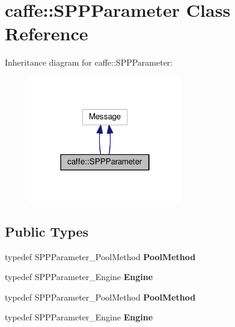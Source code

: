 \hypertarget{classcaffe_1_1_s_p_p_parameter}{}\section{caffe\+:\+:S\+P\+P\+Parameter Class Reference}
\label{classcaffe_1_1_s_p_p_parameter}


Inheritance diagram for caffe\+:\+:S\+P\+P\+Parameter\+:
\nopagebreak
\begin{figure}[H]
\begin{center}
\leavevmode
\includegraphics[width=190pt]{classcaffe_1_1_s_p_p_parameter__inherit__graph}
\end{center}
\end{figure}
\subsection*{Public Types}
\begin{DoxyCompactItemize}
\item 
\mbox{\label{classcaffe_1_1_s_p_p_parameter_ab487398f64617e46f71a1db244470b18}} 
typedef S\+P\+P\+Parameter\+\_\+\+Pool\+Method {\bfseries Pool\+Method}
\item 
\mbox{\label{classcaffe_1_1_s_p_p_parameter_a255792b6b0dd46036a93e81f3ded7774}} 
typedef S\+P\+P\+Parameter\+\_\+\+Engine {\bfseries Engine}
\item 
\mbox{\label{classcaffe_1_1_s_p_p_parameter_ab487398f64617e46f71a1db244470b18}} 
typedef S\+P\+P\+Parameter\+\_\+\+Pool\+Method {\bfseries Pool\+Method}
\item 
\mbox{\label{classcaffe_1_1_s_p_p_parameter_a255792b6b0dd46036a93e81f3ded7774}} 
typedef S\+P\+P\+Parameter\+\_\+\+Engine {\bfseries Engine}
\end{DoxyCompactItemize}
